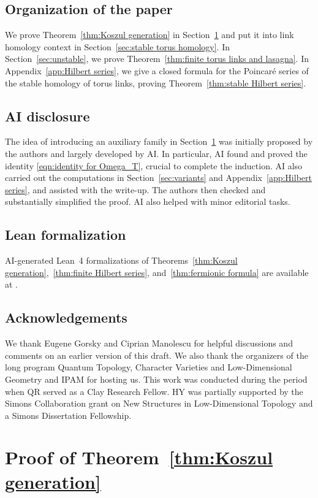 \documentclass[reqno]{amsart}
\theoremstyle{definition}
\theoremstyle{remark}
\begin{document}
\subsection*{Organization of the paper}We prove Theorem~\ref{thm:Koszul generation} in Section~\ref{sec:Koszul generation} and put it into link homology context in Section~\ref{sec:stable torus homology}. In Section~\ref{sec:unstable}, we prove Theorem~\ref{thm:finite torus links and lasagna}. In Appendix~\ref{app:Hilbert series}, we give a closed formula for the Poincar\'e series of the stable homology of torus links, proving Theorem~\ref{thm:stable Hilbert series}.

\subsection*{AI disclosure}The idea of introducing an auxiliary family in Section~\ref{sec:Koszul generation} was initially proposed by the authors and largely developed by AI. In particular, AI found and proved the identity \eqref{eqn:identity for Omega_T}, crucial to complete the induction. AI also carried out the computations in Section~\ref{sec:variants} and Appendix~\ref{app:Hilbert series}, and assisted with the write-up. The authors then checked and substantially simplified the proof. AI also helped with minor editorial tasks.

\subsection*{Lean formalization}AI-generated Lean~4 formalizations of Theorems~\ref{thm:Koszul generation},~\ref{thm:finite Hilbert series}, and~\ref{thm:fermionic formula} are available at \cite{stable_torus_link_homology}.

\subsection*{Acknowledgements}We thank Eugene Gorsky and Ciprian Manolescu for helpful discussions and comments on an earlier version of this draft. We also thank the organizers of the long program Quantum Topology, Character Varieties and Low-Dimensional Geometry and IPAM for hosting us. This work was conducted during the period when QR served as a Clay Research Fellow. HY was partially supported by the Simons Collaboration grant on New Structures in Low-Dimensional Topology and a Simons Dissertation Fellowship. 

\section{Proof of Theorem~\ref{thm:Koszul generation}}\label{sec:Koszul generation}
\end{document}
